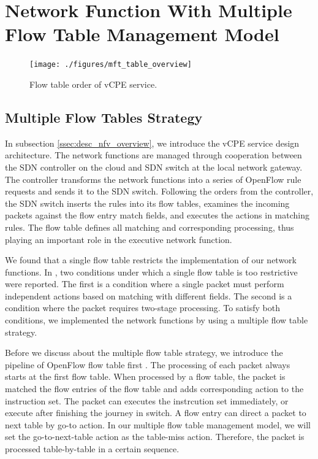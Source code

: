 \documentclass[10pt,journal]{IEEEtran}
\begin{document}
\section{Network Function With Multiple Flow Table Management Model} \label{sec:mft}

\begin{figure}[!t]
\centering
\texttt{[image: ./figures/mft\_table\_overview]}
\caption{Flow table order of vCPE service.}
\label{fig:mft_table_overview}
\end{figure}

\subsection{Multiple Flow Tables Strategy}
In subsection \ref{ssec:desc_nfv_overview}, we introduce the vCPE service design architecture. The network functions are managed through cooperation between the SDN controller on the cloud and SDN switch at the local network gateway. The controller transforms the network functions into a series of OpenFlow rule requests and sends it to the SDN switch. Following the orders from the controller, the SDN switch inserts the rules into its flow tables, examines the incoming packets against the flow entry match fields, and executes the actions in matching rules. The flow table \cite{sdn-ft} defines all matching and corresponding processing, thus playing an important role in the executive network function.

We found that a single flow table restricts the implementation of our network functions. In \cite{onf-multi-tables}, two conditions under which a single flow table is too restrictive were reported. The first is a condition where a single packet must perform independent actions based on matching with different fields. The second is a condition where the packet requires two-stage processing. To satisfy both conditions, we implemented the network functions by using a multiple flow table strategy.

Before we discuss about the multiple flow table strategy, we introduce the pipeline of OpenFlow flow table first \cite{sp:openflow13}. The processing of each packet always starts at the first flow table. When processed by a flow table, the packet is matched the flow entries of the flow table and adds corresponding action to the instruction set. The packet can executes the instrcution set immediately, or execute after finishing the journey in switch. A flow entry can direct a packet to next table by go-to action. In our multiple flow table management model, we will set the go-to-next-table action as the table-miss action. Therefore, the packet is processed table-by-table in a certain sequence.
\end{document}
